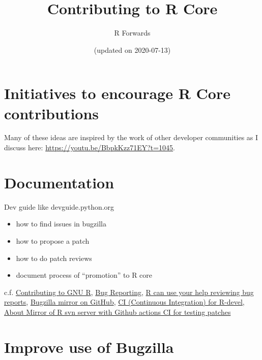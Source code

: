 \documentclass[]{book}
\title{Contributing to R Core}
\author{R Forwards}
\date{(updated on 2020-07-13)}
\providecommand{\tightlist}{%
  \setlength{\itemsep}{0pt}\setlength{\parskip}{0pt}}
\begin{document}
\maketitle

{
\setcounter{tocdepth}{1}
\tableofcontents
}
\hypertarget{section}{%
\chapter*{}\label{section}}

\hypertarget{initiatives-to-encourage-r-core-contributions}{%
\chapter{Initiatives to encourage R Core contributions}\label{initiatives-to-encourage-r-core-contributions}}

Many of these ideas are inspired by the work of other developer communities as I discuss here: \url{https://youtu.be/BbpkKzz71EY?t=1045}.

\hypertarget{documentation}{%
\chapter{Documentation}\label{documentation}}

Dev guide like devguide.python.org

\begin{itemize}
\tightlist
\item
  how to find issues in bugzilla
\item
  how to propose a patch
\item
  how to do patch reviews
\item
  document process of ``promotion'' to R core
\end{itemize}

c.f. \href{https://bookdown.org/lionel/contributing/}{Contributing to GNU R}, \href{https://www.r-project.org/bugs.html}{Bug Reporting}, \href{https://developer.r-project.org/Blog/public/2019/10/09/r-can-use-your-help-reviewing-bug-reports/index.html}{R can use your help reviewing bug reports}, \href{https://github.com/MichaelChirico/r-bugs}{Bugzilla mirror on GitHub}, \href{https://github.com/MichaelChirico/r-core-builder}{CI (Continuous Integration) for R-devel}, \href{https://github.com/jeroen/r-svn}{About
Mirror of R svn server with Github actions CI for testing patches}

\hypertarget{improve-use-of-bugzilla}{%
\chapter{Improve use of Bugzilla}\label{improve-use-of-bugzilla}}
\end{document}
